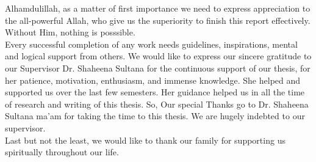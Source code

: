 Alhamdulillah, as a matter of first importance we need to express appreciation to the all-powerful Allah, who give us the superiority to finish this report effectively. Without Him, nothing is posssible.\\

Every successful completion of any work needs guidelines, inspirations, mental and logical support from others. We would like to express our sincere gratitude to our Supervisor Dr. Shaheena Sultana for the continuous support of our thesis, for her patience, motivation, enthusiasm, and immense knowledge. She helped and supported us over the last few semesters. Her guidance helped us in all the time of research and writing of this thesis. So, Our special Thanks go to Dr. Shaheena Sultana ma'am for taking the time to this thesis. We are hugely indebted to our supervisor.\\

Last but not the least, we would like to thank our family for supporting us spiritually throughout our life.

\endinput
